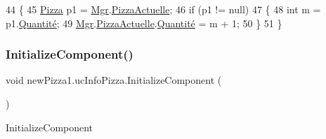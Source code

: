 \begin{DoxyCode}
44         \{
45             \hyperlink{classModele_1_1Pizza}{Pizza} p1 = \hyperlink{classnewPizza1_1_1ucInfoPizza_ade399f2ed146dd3b5b0a4784a8670652}{Mgr}.\hyperlink{classModele_1_1Manager_a7e69844aeeebbc80144850efc0d2b94c}{PizzaActuelle};
46             \textcolor{keywordflow}{if} (p1 != null)
47             \{
48                 \textcolor{keywordtype}{int} m = p1.\hyperlink{classModele_1_1Pizza_ae755ca79feb6f9a522aa18544c3f1310}{Quantité};
49                 \hyperlink{classnewPizza1_1_1ucInfoPizza_ade399f2ed146dd3b5b0a4784a8670652}{Mgr}.\hyperlink{classModele_1_1Manager_a7e69844aeeebbc80144850efc0d2b94c}{PizzaActuelle}.\hyperlink{classModele_1_1Pizza_ae755ca79feb6f9a522aa18544c3f1310}{Quantité} = m + 1;
50             \}
51         \}
\end{DoxyCode}
\mbox{\label{classnewPizza1_1_1ucInfoPizza_a5d6e37c02a381d24941d4f45b4a21dbe}} 
\subsubsection{\texorpdfstring{Initialize\+Component()}{InitializeComponent()}\hspace{0.1cm}{\footnotesize\ttfamily [1/6]}}
{\footnotesize\ttfamily void new\+Pizza1.\+uc\+Info\+Pizza.\+Initialize\+Component (\begin{DoxyParamCaption}{ }\end{DoxyParamCaption})\hspace{0.3cm}{\ttfamily [inline]}}



Initialize\+Component 


